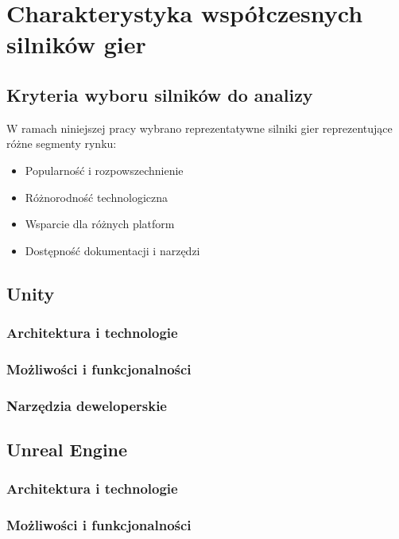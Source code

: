 \clearpage
\section{Charakterystyka współczesnych silników gier}

\subsection{Kryteria wyboru silników do analizy}
W ramach niniejszej pracy wybrano reprezentatywne silniki gier reprezentujące różne segmenty rynku:
\begin{itemize}
    \item Popularność i rozpowszechnienie
    \item Różnorodność technologiczna
    \item Wsparcie dla różnych platform
    \item Dostępność dokumentacji i narzędzi
\end{itemize}

\subsection{Unity}
\subsubsection{Architektura i technologie}

\subsubsection{Możliwości i funkcjonalności}

\subsubsection{Narzędzia deweloperskie}

\subsection{Unreal Engine}
\subsubsection{Architektura i technologie}

\subsubsection{Możliwości i funkcjonalności}

